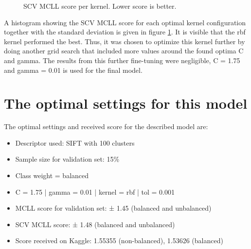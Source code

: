 \begin{figure}
    \centering
    \captionsetup{width=0.8\linewidth}
    \captionsetup{justification=centering}
    \caption{SCV MCLL score per kernel. \newline Lower score is better.}
    \label{fig:SVC_optima_w_std}
\end{figure}

A histogram showing the SCV MCLL score for each optimal kernel configuration together with the standard deviation is given in figure \ref{fig:SVC_optima_w_std}.
It is visible that the rbf kernel performed the best.
Thus, it was chosen to optimize this kernel further by doing another grid search that included more values around the found optima C and gamma.
The results from this further fine-tuning were negligible, C = 1.75 and gamma = 0.01 is used for the final model.


\section{The optimal settings for this model}
\label{section:svc_optimal}

The optimal settings and received score for the described model are:
\begin{itemize}
    \item Descriptor used: SIFT with 100 clusters
    \item Sample size for validation set: 15\%
    \item Class weight = balanced
    \item C =  1.75 | gamma = 0.01 | kernel = rbf | tol = 0.001
    \item MCLL score for validation set: ± 1.45 (balanced and unbalanced)
    \item SCV MCLL score: ± 1.48 (balanced and unbalanced)
    \item Score received on Kaggle: 1.55355 (non-balanced), 1.53626 (balanced)
\end{itemize}